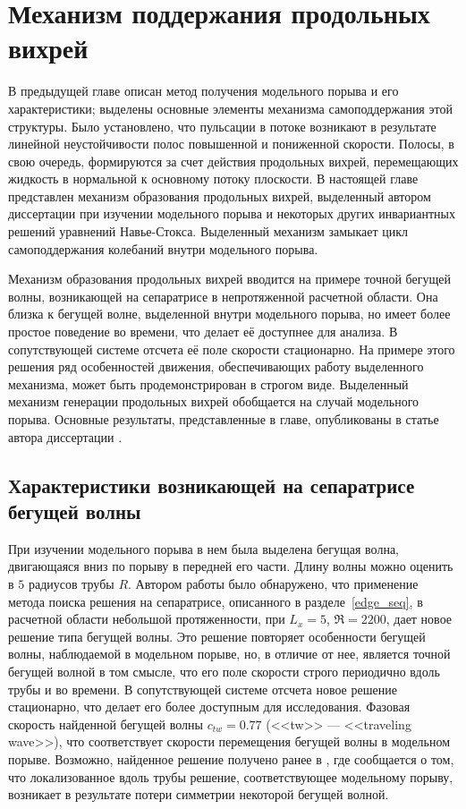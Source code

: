 
\chapter{Механизм поддержания продольных вихрей}

В предыдущей главе описан метод получения модельного порыва и его характеристики; выделены основные элементы механизма самоподдержания этой структуры. Было установлено, что пульсации в потоке возникают в результате линейной неустойчивости полос повышенной и пониженной скорости. Полосы, в свою очередь, формируются за счет действия продольных вихрей, перемещающих жидкость в нормальной к основному потоку плоскости. В настоящей главе представлен механизм образования продольных вихрей, выделенный автором диссертации при изучении модельного порыва и некоторых других инвариантных решений уравнений Навье-Стокса. Выделенный механизм замыкает цикл самоподдержания колебаний внутри модельного порыва. 

Механизм образования продольных вихрей вводится на примере точной бегущей волны, возникающей на сепаратрисе в непротяженной расчетной области. Она близка к бегущей волне, выделенной внутри модельного порыва, но имеет более простое поведение во времени, что делает её доступнее для анализа. В сопутствующей системе отсчета её поле скорости стационарно. На примере этого решения ряд особенностей движения, обеспечивающих работу выделенного механизма, может быть продемонстрирован в строгом виде. Выделенный механизм генерации продольных вихрей обобщается на случай модельного порыва. Основные результаты, представленные в главе, опубликованы в статье автора диссертации \cite{MZG2017}. 



\section{Характеристики возникающей на сепаратрисе бегущей волны}

При изучении модельного порыва в нем была выделена бегущая волна, двигающаяся вниз по порыву в передней его части. Длину волны можно оценить в $5$ радиусов трубы $R$. Автором работы было обнаружено, что применение метода поиска решения на сепаратрисе, описанного в разделе~\ref{edge_seq}, в расчетной области небольшой протяженности, при $L_x = 5$, $\Re = 2200$, дает новое решение типа бегущей волны. Это решение повторяет особенности бегущей волны, наблюдаемой в модельном порыве, но, в отличие от нее, является точной бегущей волной в том смысле, что его поле скорости строго периодично вдоль трубы и во времени. В сопутствующей системе отсчета новое решение стационарно, что делает его более доступным для исследования. Фазовая скорость найденной бегущей волны $c_{tw} = 0.77$ (<<tw>> --- <<traveling wave>>), что соответствует скорости перемещения бегущей волны в модельном порыве. Возможно, найденное решение получено ранее в \cite{Chantry2014}, где сообщается о том, что локализованное вдоль трубы решение, соответствующее модельному порыву, возникает в результате потери симметрии некоторой бегущей волной. 

